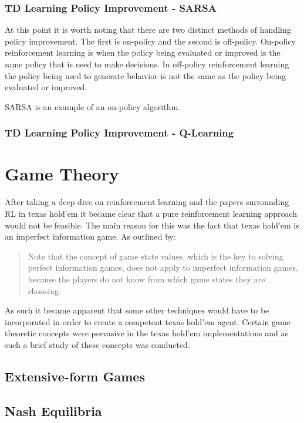 \subsubsection{TD Learning Policy Improvement - SARSA}
At this point it is worth noting that there are two distinct methods of handling policy improvement.
The first is on-policy and the second is off-policy.
On-policy reinforcement learning is when the policy being evaluated or improved is the same policy that is used
to make decisions.
In off-policy reinforcement learning the policy being used to generate behavior is not the same as the policy
being evaluated or improved.

SARSA is an example of an on-policy algorithm.

\subsubsection{TD Learning Policy Improvement - Q-Learning}

\section{Game Theory}\label{sec:gameTheory}
After taking a deep dive on reinforcement learning and the papers surrounding RL in texas hold'em it became
clear that a pure reinforcement learning approach would not be feasible.
The main reason for this was the fact that texas hold'em is an imperfect information game.
As outlined by\citep{dahl2001reinforcement}:
\begin{quotation}
Note that the concept of game state values, which is the key to solving perfect information games,
does not apply to imperfect information games, because the players do not know from  which game states they
are choosing.
\end{quotation}
As such it became apparent that some other techniques would have to be incorporated in order to create a competent
texas hold'em agent.
Certain game theoretic concepts were pervasive in the texas hold'em implementations and as such a brief study
of these concepts was conducted.

\subsection{Extensive-form Games}\label{subsec:extensiveForm}
\subsection{Nash Equilibria}\label{subsec:nashEquilibria}
